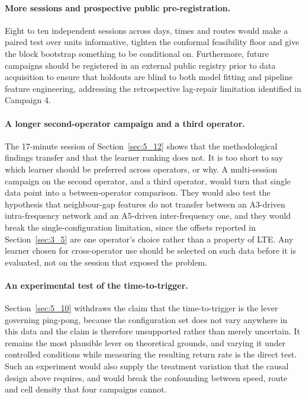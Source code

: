 \paragraph{More sessions and prospective public pre-registration.} Eight to ten independent sessions across days, times and routes would make a paired test over units informative, tighten the conformal feasibility floor and give the block bootstrap something to be conditional on. Furthermore, future campaigns should be registered in an external public registry prior to data acquisition to ensure that holdouts are blind to both model fitting and pipeline feature engineering, addressing the retrospective lag-repair limitation identified in Campaign 4.

\paragraph{A longer second-operator campaign and a third operator.} The 17-minute session of Section~\ref{sec:5_12} shows that the methodological findings transfer and that the learner ranking does not. It is too short to say which learner should be preferred across operators, or why. A multi-session campaign on the second operator, and a third operator, would turn that single data point into a between-operator comparison. They would also test the hypothesis that neighbour-gap features do not transfer between an A3-driven intra-frequency network and an A5-driven inter-frequency one, and they would break the single-configuration limitation, since the offsets reported in Section~\ref{sec:3_5} are one operator's choice rather than a property of LTE. Any learner chosen for cross-operator use should be selected on such data before it is evaluated, not on the session that exposed the problem.

\paragraph{An experimental test of the time-to-trigger.} Section~\ref{sec:5_10} withdraws the claim that the time-to-trigger is the lever governing ping-pong, because the configuration set does not vary anywhere in this data and the claim is therefore unsupported rather than merely uncertain. It remains the most plausible lever on theoretical grounds, and varying it under controlled conditions while measuring the resulting return rate is the direct test. Such an experiment would also supply the treatment variation that the causal design above requires, and would break the confounding between speed, route and cell density that four campaigns cannot.

